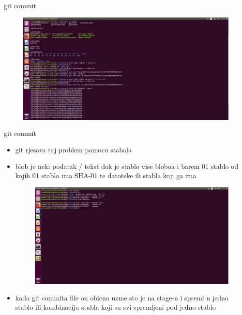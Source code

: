 \documentclass[]{beamer}
\begin{document}
\begin{frame}{git commit}
\begin{figure}
\centering
\includegraphics[scale=.01]{./slike/druga_slika.jpg}
\end{figure}

\end{frame}

\begin{frame}{git commit}

\begin{itemize}
	\item git rjesava taj problem pomocu stabala
	\item blob je neki podatak / tekst dok je stablo vise bloboa i barem 01 stablo od kojih 01 stablo ima SHA-01 te datoteke ili stabla koji ga ima
	\begin{figure}
		\centering
	\includegraphics[scale=.01]{./slike/treca_slika.jpg}
	\end{figure}
	\item kada git commita file on obicno uzme sto je na stage-u i spremi u jedno stablo ili kombinaciju stabla koji su svi spremljeni pod jedno stablo
\end{itemize}
\end{frame}
\end{document}
